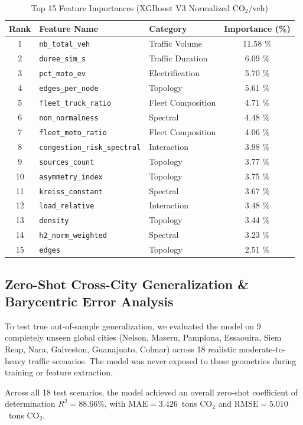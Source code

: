 \documentclass[lettersize,journal]{IEEEtran}
\begin{document}
\begin{table}[htbp]
\caption{Top 15 Feature Importances (XGBoost V3 Normalized $\text{CO}_2$/veh)}
\label{tab:feature_importance}
\centering
\begin{tabular}{cllc}
\toprule
Rank & Feature Name & Category & Importance (\%) \\
\midrule
1 & \texttt{nb\_total\_veh} & Traffic Volume & 11.58 \% \\
2 & \texttt{duree\_sim\_s} & Traffic Duration & 6.09 \% \\
3 & \texttt{pct\_moto\_ev} & Electrification & 5.70 \% \\
4 & \texttt{edges\_per\_node} & Topology & 5.61 \% \\
5 & \texttt{fleet\_truck\_ratio} & Fleet Composition & 4.71 \% \\
6 & \texttt{non\_normalness} & Spectral & 4.48 \% \\
7 & \texttt{fleet\_moto\_ratio} & Fleet Composition & 4.06 \% \\
8 & \texttt{congestion\_risk\_spectral} & Interaction & 3.98 \% \\
9 & \texttt{sources\_count} & Topology & 3.77 \% \\
10 & \texttt{asymmetry\_index} & Topology & 3.75 \% \\
11 & \texttt{kreiss\_constant} & Spectral & 3.67 \% \\
12 & \texttt{load\_relative} & Interaction & 3.48 \% \\
13 & \texttt{density} & Topology & 3.44 \% \\
14 & \texttt{h2\_norm\_weighted} & Spectral & 3.23 \% \\
15 & \texttt{edges} & Topology & 2.51 \% \\
\bottomrule
\end{tabular}
\end{table}

\subsection{Zero-Shot Cross-City Generalization \& Barycentric Error Analysis}
To test true out-of-sample generalization, we evaluated the model on 9 completely unseen global cities (Nelson, Maseru, Pamplona, Essaouira, Siem Reap, Nara, Galveston, Guanajuato, Colmar) across 18 realistic moderate-to-heavy traffic scenarios. The model was never exposed to these geometries during training or feature extraction.

Across all 18 test scenarios, the model achieved an overall zero-shot coefficient of determination $R^2 = 88.66\%$, with $\text{MAE} = 3.426$~tons $\text{CO}_2$ and $\text{RMSE} = 5.010$~tons $\text{CO}_2$. 
\end{document}
